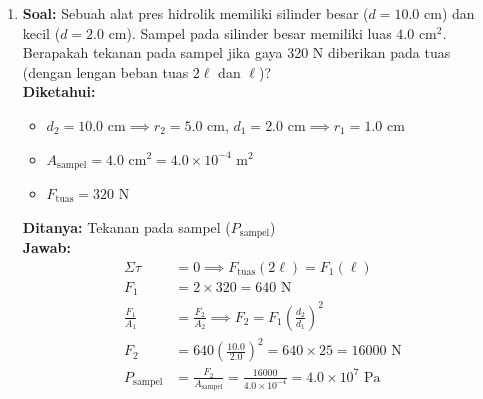 \documentclass[twocolumn]{article}
\begin{document}
\begin{enumerate}
    \item \textbf{Soal:} Sebuah alat pres hidrolik memiliki silinder besar ($d = 10.0 \text{ cm}$) dan kecil ($d = 2.0 \text{ cm}$). Sampel pada silinder besar memiliki luas $4.0 \text{ cm}^2$. Berapakah tekanan pada sampel jika gaya 320 N diberikan pada tuas (dengan lengan beban tuas $2\ell$ dan $\ell$)? \\
    \textbf{Diketahui:}
    \begin{itemize}
        \item $d_2 = 10.0 \text{ cm} \implies r_2 = 5.0 \text{ cm}$, \quad $d_1 = 2.0 \text{ cm} \implies r_1 = 1.0 \text{ cm}$
        \item $A_{\text{sampel}} = 4.0 \text{ cm}^2 = 4.0 \times 10^{-4} \text{ m}^2$
        \item $F_{\text{tuas}} = 320 \text{ N}$
    \end{itemize}
    \textbf{Ditanya:} Tekanan pada sampel ($P_{\text{sampel}}$) \\
    \textbf{Jawab:}
    \begin{align*}
        \Sigma \tau &= 0 \implies F_{\text{tuas}} (2\ell) = F_1 (\ell) \\
        F_1 &= 2 \times 320 = 640 \text{ N} \\
        \frac{F_1}{A_1} &= \frac{F_2}{A_2} \implies F_2 = F_1 \left( \frac{d_2}{d_1} \right)^2 \\
        F_2 &= 640 \left( \frac{10.0}{2.0} \right)^2 = 640 \times 25 = 16000 \text{ N} \\
        P_{\text{sampel}} &= \frac{F_2}{A_{\text{sampel}}} = \frac{16000}{4.0 \times 10^{-4}} = 4.0 \times 10^7 \text{ Pa}
    \end{align*}


\end{enumerate}
\end{document}
